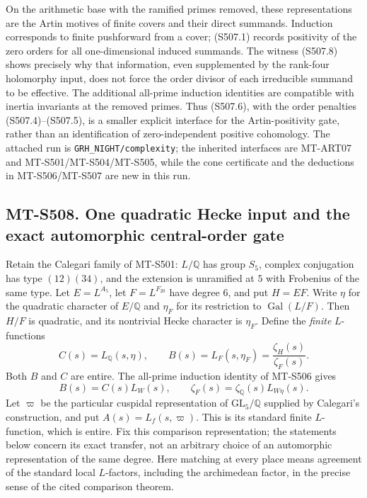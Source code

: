 On the arithmetic base with the ramified primes removed, these
representations are the Artin motives of finite covers and their
direct summands.  Induction corresponds to finite pushforward
from a cover; (S507.1) records positivity of the zero orders
for all one-dimensional induced summands.  The witness (S507.8)
shows precisely why that information, even supplemented by the
rank-four holomorphy input, does not force the order divisor of
each irreducible summand to be effective.  The additional
all-prime induction identities are compatible with inertia
invariants at the removed primes.  Thus (S507.6), with the order
penalties (S507.4)--(S507.5), is a smaller explicit interface for
the Artin-positivity gate, rather than an identification of
zero-independent positive cohomology.  The attached run is
\texttt{GRH\_NIGHT/complexity}; the inherited interfaces are
MT-ART07 and MT-S501/MT-S504/MT-S505, while the cone certificate
and the deductions in MT-S506/MT-S507 are new in this run.

\subsection*{MT-S508. One quadratic Hecke input and the exact automorphic central-order gate}

Retain the Calegari family of MT-S501: $L/\mathbb Q$ has group
$S_5$, complex conjugation has type $(12)(34)$, and the extension
is unramified at $5$ with Frobenius of the same type.  Let
$E=L^{A_5}$, let $F=L^{F_{20}}$ have degree $6$, and put $H=EF$.
Write $\eta$ for the quadratic character of $E/\mathbb Q$ and
$\eta_F$ for its restriction to $\operatorname{Gal}(L/F)$.
Then $H/F$ is quadratic, and its nontrivial Hecke character is
$\eta_F$.  Define the \emph{finite} $L$-functions
\[
 C(s)=L_{\mathbb Q}(s,\eta),\qquad
 B(s)=L_F(s,\eta_F)=\frac{\zeta_H(s)}{\zeta_F(s)}.
 \tag{S508.1}
\]
Both $B$ and $C$ are entire.  The all-prime induction identity
of MT-S506 gives
\[
             B(s)=C(s)L_W(s),\qquad
             \zeta_F(s)=\zeta_{\mathbb Q}(s)L_{W\eta}(s).
 \tag{S508.2}
\]
Let $\varpi$ be the particular cuspidal representation of
$\mathrm{GL}_5/\mathbb Q$ supplied by Calegari's construction,
and put $A(s)=L_f(s,\varpi)$.  This is its standard finite
$L$-function, which is entire.  Fix this comparison representation;
the statements below concern its exact transfer, not an arbitrary
choice of an automorphic representation of the same degree.
Here matching at every place means agreement of the standard
local $L$-factors, including the archimedean factor, in the
precise sense of the cited comparison theorem.

